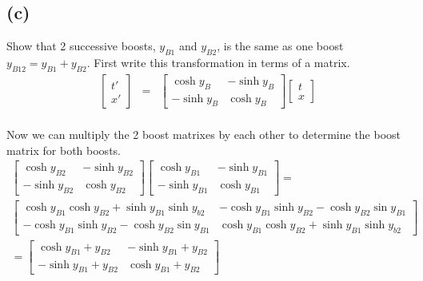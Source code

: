 \documentclass[11pt]{amsart}
\begin{document}
\subsection*{(c)} Show that 2 successive boosts, $y_{B1}$ and $y_{B2}$, is the same as one boost $y_{B12}=y_{B1}+y_{B2}$. First write this transformation in terms of a matrix. \\
\begin{eqnarray*} 
\begin{bmatrix}
t' \\
x' 
\end{bmatrix} &=& \begin{bmatrix}
	\cosh{y_{B}} & -\sinh{y_{B}} \\
	-\sinh{y_{B}} & \cosh{y_{B}} 
	\end{bmatrix}\begin{bmatrix}
	t \\
	x 
	\end{bmatrix} 
\end{eqnarray*} \\
Now we can multiply the 2 boost matrixes by each other to determine the boost matrix for both boosts. \\
\begin{eqnarray*}
\begin{bmatrix}
	\cosh{y_{B2}} & -\sinh{y_{B2}} \\
	-\sinh{y_{B2}} & \cosh{y_{B2}} 
	\end{bmatrix}\begin{bmatrix}
	\cosh{y_{B1}} & -\sinh{y_{B1}} \\
	-\sinh{y_{B1}} & \cosh{y_{B1}} 
	\end{bmatrix} = \\
 \begin{bmatrix}
	\cosh{y_{B1}}\cosh{y_{B2}}+\sinh{y_{B1}}\sinh{y_{b2}} & -\cosh{y_{B1}}\sinh{y_{B2}}-\cosh{y_{B2}}\sin{y_{B1}} \\
	-\cosh{y_{B1}}\sinh{y_{B2}}-\cosh{y_{B2}}\sin{y_{B1}} & \cosh{y_{B1}}\cosh{y_{B2}}+\sinh{y_{B1}}\sinh{y_{b2}}
	\end{bmatrix} \\
= \begin{bmatrix}
	\cosh{y_{B1}+y_{B2}} & -\sinh{y_{B1}+y_{B2}} \\
	-\sinh{y_{B1}+y_{B2}} & \cosh{y_{B1}+y_{B2}} 
	\end{bmatrix}
	\end{eqnarray*} 
\end{document}
